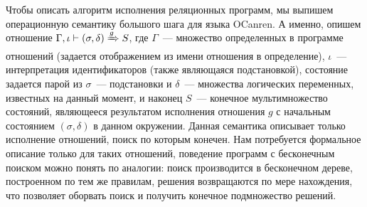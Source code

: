     Чтобы описать алгоритм исполнения реляционных программ, мы выпишем операционную семантику большого шага для языка OCanren. А именно, опишем отношение $\Gamma, \iota \vdash (\sigma, \delta) \xRightarrow{g} S$, где $\Gamma$~--- множество определенных в программе отношений (задается отображением из имени отношения в определение), $\iota$~--- интерпретация идентификаторов (также являющаяся подстановкой), состояние задается парой из $\sigma$~--- подстановки и $\delta$~--- множества логических переменных,  известных на данный момент, и наконец $S$~--- конечное мультимножество состояний, являющееся результатом исполнения отношения $g$ с начальным состоянием $(\sigma, \delta)$ в данном окружении. Данная семантика описывает только исполнение отношений, поиск по которым конечен. Нам потребуется формальное описание только для таких отношений, поведение программ с бесконечным поиском можно понять по аналогии: поиск производится в бесконечном дереве, построенном по тем же правилам, решения возвращаются по мере нахождения, что позволяет оборвать поиск и получить конечное подмножество решений.
    
